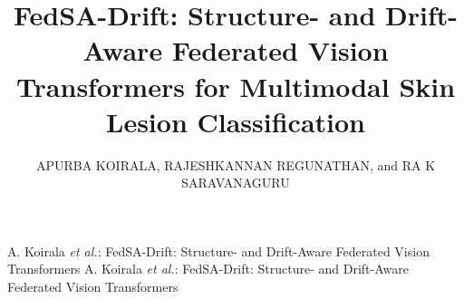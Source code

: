\documentclass{ieeeaccess}
\begin{document}

\title{FedSA-Drift: Structure- and Drift-Aware Federated Vision Transformers for Multimodal Skin Lesion Classification}
\author{\uppercase{Apurba Koirala},
\uppercase{Rajeshkannan Regunathan}, and
\uppercase{RA K Saravanaguru}}
\address[1]{School of Computer Science and Engineering, Vellore Institute of Technology,
Vellore 632014, India (e-mail: apurbakoirala33@gmail.com; rajeshkannan.r@vit.ac.in; saravanank@vit.ac.in)}

\markboth
{A. Koirala \textit{et al.}: FedSA-Drift: Structure- and Drift-Aware Federated Vision Transformers}
{A. Koirala \textit{et al.}: FedSA-Drift: Structure- and Drift-Aware Federated Vision Transformers}

\end{document}
